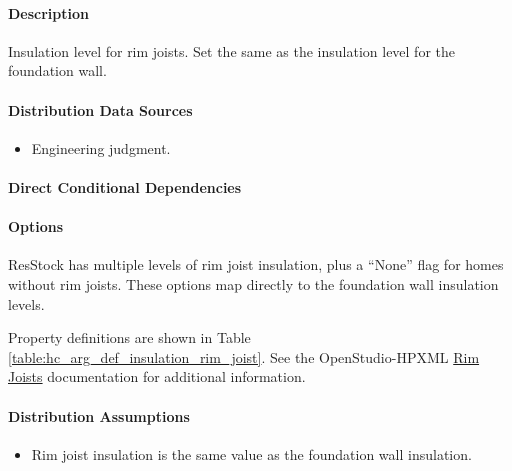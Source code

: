\paragraph{Description}
% 
Insulation level for rim joists. Set the same as the insulation level for the foundation wall.

\paragraph{Distribution Data Sources}
% 
\begin{itemize}

\item
  Engineering judgment.
\end{itemize}

\paragraph{Direct Conditional Dependencies}


\paragraph{Options}
ResStock has multiple levels of rim joist insulation, plus a ``None'' flag for homes without rim joists. These options map directly to the foundation wall insulation levels.



Property definitions are shown in Table \ref{table:hc_arg_def_insulation_rim_joist}. See the OpenStudio-HPXML \href{https://openstudio-hpxml.readthedocs.io/en/v1.10.0/workflow_inputs.html#hpxml-rim-joists}{Rim Joists} documentation for additional information.



\paragraph{Distribution Assumptions}
% 
\begin{itemize}

\item
  Rim joist insulation is the same value as the foundation wall
  insulation.
\end{itemize}
